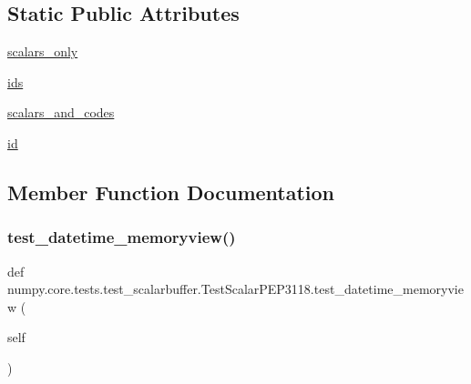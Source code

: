\subsection*{Static Public Attributes}
\begin{DoxyCompactItemize}
\item 
\hyperlink{classnumpy_1_1core_1_1tests_1_1test__scalarbuffer_1_1TestScalarPEP3118_adc261f434f6bf6abc1c4ae6dfaa5fd90}{scalars\+\_\+only}
\item 
\hyperlink{classnumpy_1_1core_1_1tests_1_1test__scalarbuffer_1_1TestScalarPEP3118_a5d46872085f6819e883a326e6e590fba}{ids}
\item 
\hyperlink{classnumpy_1_1core_1_1tests_1_1test__scalarbuffer_1_1TestScalarPEP3118_a1c4a426bdc49667110da774af275b53c}{scalars\+\_\+and\+\_\+codes}
\item 
\hyperlink{classnumpy_1_1core_1_1tests_1_1test__scalarbuffer_1_1TestScalarPEP3118_a319bc53a3a5625bd8300a31a6b2624a7}{id}
\end{DoxyCompactItemize}


\subsection{Member Function Documentation}
\mbox{\label{classnumpy_1_1core_1_1tests_1_1test__scalarbuffer_1_1TestScalarPEP3118_a35d7bb150d74e4e360089b82aa2e4988}} 
\subsubsection{\texorpdfstring{test\+\_\+datetime\+\_\+memoryview()}{test\_datetime\_memoryview()}}
{\footnotesize\ttfamily def numpy.\+core.\+tests.\+test\+\_\+scalarbuffer.\+Test\+Scalar\+P\+E\+P3118.\+test\+\_\+datetime\+\_\+memoryview (\begin{DoxyParamCaption}\item[{}]{self }\end{DoxyParamCaption})}

